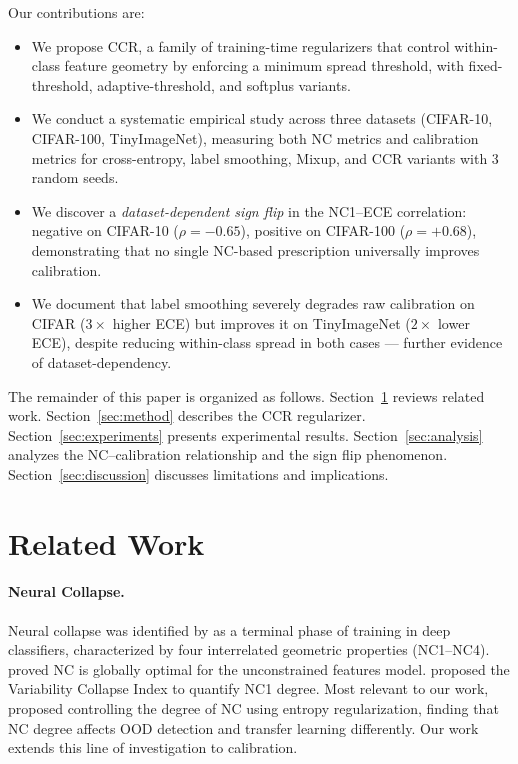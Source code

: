 \documentclass{article}
\begin{document}
Our contributions are:
\begin{itemize}
    \item We propose CCR, a family of training-time regularizers that control within-class feature geometry by enforcing a minimum spread threshold, with fixed-threshold, adaptive-threshold, and softplus variants.
    \item We conduct a systematic empirical study across three datasets (CIFAR-10, CIFAR-100, TinyImageNet), measuring both NC metrics and calibration metrics for cross-entropy, label smoothing, Mixup, and CCR variants with 3 random seeds.
    \item We discover a \emph{dataset-dependent sign flip} in the NC1--ECE correlation: negative on CIFAR-10 ($\rho = -0.65$), positive on CIFAR-100 ($\rho = +0.68$), demonstrating that no single NC-based prescription universally improves calibration.
    \item We document that label smoothing severely degrades raw calibration on CIFAR ($3\times$ higher ECE) but improves it on TinyImageNet ($2\times$ lower ECE), despite reducing within-class spread in both cases --- further evidence of dataset-dependency.
\end{itemize}

The remainder of this paper is organized as follows. Section~\ref{sec:related} reviews related work. Section~\ref{sec:method} describes the CCR regularizer. Section~\ref{sec:experiments} presents experimental results. Section~\ref{sec:analysis} analyzes the NC--calibration relationship and the sign flip phenomenon. Section~\ref{sec:discussion} discusses limitations and implications.

\section{Related Work}
\label{sec:related}

\paragraph{Neural Collapse.}
Neural collapse was identified by \citet{papyan2020prevalence} as a terminal phase of training in deep classifiers, characterized by four interrelated geometric properties (NC1--NC4). \citet{zhu2021geometric} proved NC is globally optimal for the unconstrained features model. \citet{xu2023quantifying} proposed the Variability Collapse Index to quantify NC1 degree. Most relevant to our work, \citet{harun2025controlling} proposed controlling the degree of NC using entropy regularization, finding that NC degree affects OOD detection and transfer learning differently. Our work extends this line of investigation to calibration.
\end{document}
